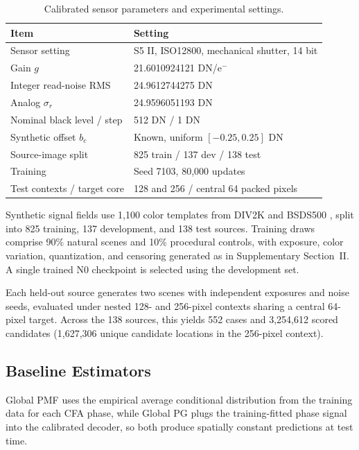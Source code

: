 \documentclass[10pt,twocolumn,journal]{IEEEtran}
\begin{document}
\begin{table}[t]
\centering
\caption{Calibrated sensor parameters and experimental settings.}
\label{tab:protocol}
\small
\begin{tabular}{@{}p{}p{}@{}}
\toprule
Item & Setting\\
\midrule
Sensor setting & S5 II, ISO12800, mechanical shutter, 14 bit\\
Gain $g$ & 21.6010924121 DN/e$^{-}$\\
Integer read-noise RMS & 24.9612744275 DN\\
Analog $\sigma_r$ & 24.9596051193 DN\\
Nominal black level / step & 512 DN / 1 DN\\
Synthetic offset $b_c$ & Known, uniform $[-0.25,0.25]$ DN\\
Source-image split & 825 train / 137 dev / 138 test\\
Training & Seed 7103, 80,000 updates\\
Test contexts / target core & 128 and 256 / central 64 packed pixels\\
\bottomrule
\end{tabular}
\end{table}

Synthetic signal fields use 1,100 color templates from DIV2K and BSDS500 \cite{div2k,bsds500}, split into 825 training, 137 development, and 138 test sources. Training draws comprise 90\% natural scenes and 10\% procedural controls, with exposure, color variation, quantization, and censoring generated as in Supplementary Section~II. A single trained N0 checkpoint is selected using the development set.

Each held-out source generates two scenes with independent exposures and noise seeds, evaluated under nested 128- and 256-pixel contexts sharing a central 64-pixel target. Across the 138 sources, this yields 552 cases and 3,254,612 scored candidates (1,627,306 unique candidate locations in the 256-pixel context).

\subsection{Baseline Estimators}\label{sec:baselines}
Global PMF uses the empirical average conditional distribution from the training data for each CFA phase, while Global PG plugs the training-fitted phase signal into the calibrated decoder, so both produce spatially constant predictions at test time.
\end{document}
